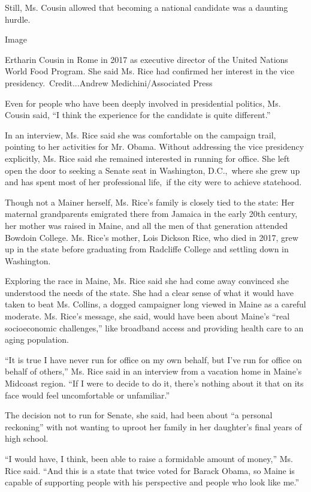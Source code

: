 Still, Ms. Cousin allowed that becoming a national candidate was a
daunting hurdle.

Image

Ertharin Cousin in Rome in 2017 as executive director of the United
Nations World Food Program. She said Ms. Rice had confirmed her interest
in the vice presidency.~Credit...Andrew Medichini/Associated Press

Even for people who have been deeply involved in presidential politics,
Ms. Cousin said, ``I think the experience for the candidate is quite
different.''

In an interview, Ms. Rice said she was comfortable on the campaign
trail, pointing to her activities for Mr. Obama. Without addressing the
vice presidency explicitly, Ms. Rice said she remained interested in
running for office. She left open the door to seeking a Senate seat in
Washington, D.C.,~where she grew up and has spent most of her
professional life,~if the city were to achieve statehood.

Though not a Mainer herself, Ms. Rice's family is closely tied to the
state: Her maternal grandparents emigrated there from Jamaica in the
early 20th century, her mother was raised in Maine, and all the men of
that generation attended Bowdoin College. Ms. Rice's mother, Lois
Dickson Rice, who died in 2017, grew up in the state before graduating
from Radcliffe College and settling down in Washington.

Exploring the race in Maine, Ms. Rice said she had come away convinced
she understood the needs of the state. She had a clear sense of what it
would have taken to beat Ms. Collins, a dogged campaigner long viewed in
Maine as a careful moderate. Ms. Rice's message, she said, would have
been about Maine's ``real socioeconomic challenges,'' like broadband
access and providing health care to an aging population.

``It is true I have never run for office on my own behalf, but I've run
for office on behalf of others,'' Ms. Rice said in an interview from a
vacation home in Maine's Midcoast region. ``If I were to decide to do
it, there's nothing about it that on its face would feel uncomfortable
or unfamiliar.''

The decision not to run for Senate, she said, had been about ``a
personal reckoning'' with not wanting to uproot her family in her
daughter's final years of high school.

``I would have, I think, been able to raise a formidable amount of
money,'' Ms. Rice said. ``And this is a state that twice voted for
Barack Obama, so Maine is capable of supporting people with his
perspective and people who look like me.''

